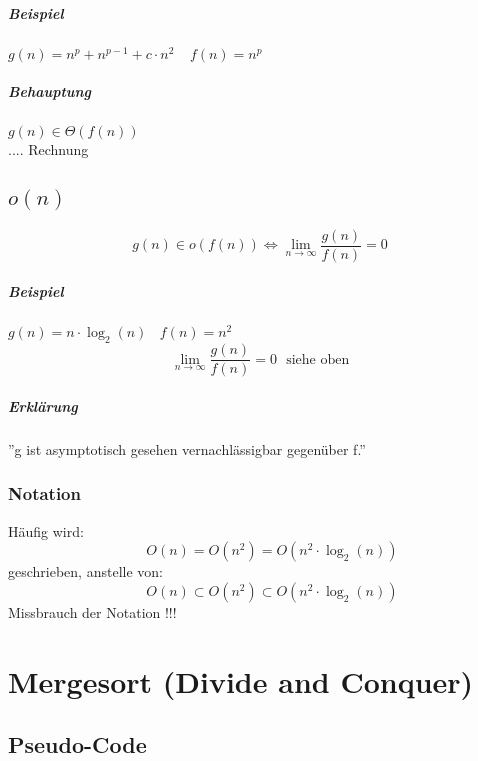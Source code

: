 \paragraph{Beispiel} $g(n) = n^p + n^{p-1} + c \cdot n^2~~~~~f(n) = n^p$
\paragraph{Behauptung} $g(n) \in \Theta(f(n))$ \\
.... Rechnung

\section{$o(n)$}

\[g(n) \in o(f(n)) \Leftrightarrow \lim\limits_{n \rightarrow \infty}{\frac{g(n)}{f(n)}} = 0\]
\paragraph{Beispiel} $g(n) = n \cdot \log_2(n)~~~~f(n) = n^2$\\
\[\lim\limits_{n \rightarrow \infty}{\frac{g(n)}{f(n)}} = 0~~~\text{siehe oben}\]
\paragraph{Erklärung} ''g ist asymptotisch gesehen vernachlässigbar gegenüber f.''


\begin{mdframed}
\subsection{Notation}
Häufig wird:
\[~~~~~~~~O(n) = O(n^2) = O(n^2 \cdot \log_2(n))\]
geschrieben, anstelle von:
\[~~~~~~~~O(n) \subset O(n^2) \subset O(n^2 \cdot \log_2(n))\]
Missbrauch der Notation !!!\\

\end{mdframed}


\chapter{Mergesort (Divide and Conquer)}

\section{Pseudo-Code}



